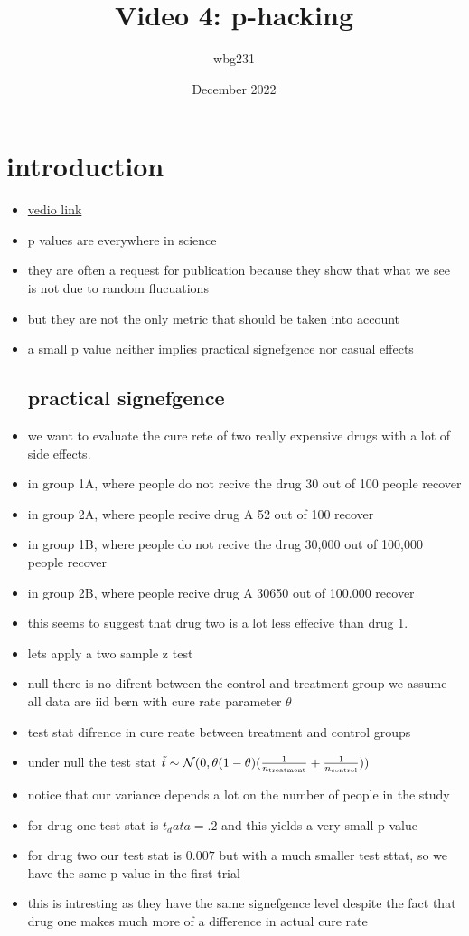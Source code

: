 \documentclass{article}
\title{Video 4: p-hacking}
\author{wbg231 }
\date{December 2022}
\begin{document}
\maketitle

\section*{introduction}
\begin{itemize}
\item \href{https://www.youtube.com/watch?v=acTMImWTKpQ&list=PLBEf5mJtE6KuZ5NBQMuWIMsiOOrV9ibzm&index=85}{vedio link}
\item p values are everywhere in science 
\item they are often a request for publication because they show that what we see is not due to random flucuations
\item but they are not the only metric that should be taken into account
\item a small p value neither implies practical signefgence nor casual effects
\subsection*{practical signefgence}
\item we want to evaluate the cure rete of two really expensive drugs with a lot of side effects. 
\item in group 1A, where people do not recive the drug 30 out of 100 people recover
\item in group 2A, where people recive drug A 52 out of 100 recover
\item in group 1B, where people do not recive the drug 30,000 out of 100,000 people recover
\item in group 2B, where people recive drug A 30650 out of 100.000 recover
\item this seems to suggest that drug two is a lot less effecive than drug 1. 
\item lets apply a two sample z test 
\item null there is no difrent between the control and treatment group we assume all data are iid bern with cure rate parameter $\theta$
\item test stat difrence in cure reate between treatment and control groups
\item under null the test stat $\Tilde{t}\sim\mathcal{N}(0,\theta(1-\theta)(\frac{1}{n_{\text{treatment}}}+\frac{1}{n_{\text{control}}}))$
\item notice that our variance depends a lot on the number of people in the study
\item for drug one test stat is $t_data=.2$ and this yields a very small p-value
\item for drug two our test stat is $0.007$ but with a much smaller test sttat, so we have the same p value in the first trial 
\item this is intresting as they have the same signefgence level despite the fact that drug one makes much more of a difference in actual cure rate 

\end{itemize}
\end{document}
